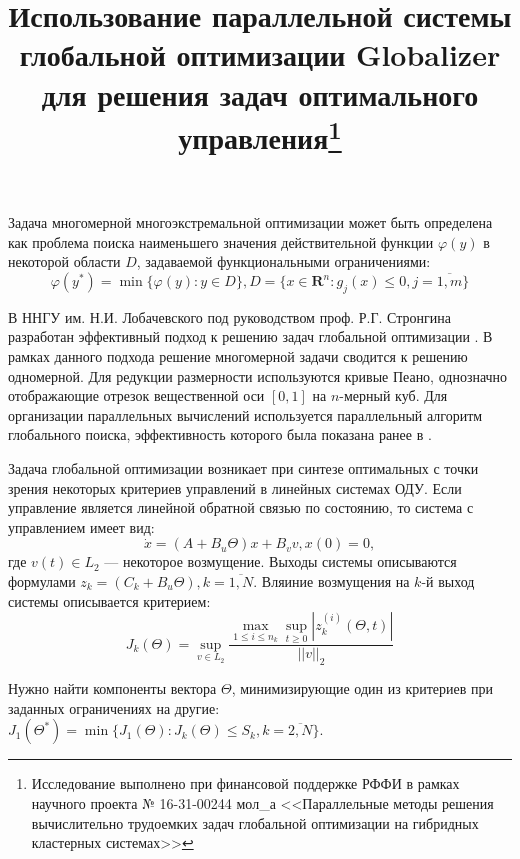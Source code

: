 \documentclass[11pt, oneside, a4paper]{article}
\begin{document}

\title{Использование параллельной системы глобальной оптимизации Globalizer для
решения задач оптимального управления\footnote{Исследование выполнено при финансовой
поддержке РФФИ в рамках научного проекта № 16-31-00244 мол\_а <<Параллельные методы
решения вычислительно трудоемких задач глобальной оптимизации на гибридных кластерных системах>>}}


Задача многомерной многоэкстремальной оптимизации может быть определена как проблема
поиска наименьшего значения действительной функции \(\varphi(y)\) в некоторой области \(D\),
задаваемой функциональными ограничениями:
\begin{displaymath}
  \label{task}
    \varphi(y^*)=\min\{\varphi(y):y\in D\}, D=\{x\in \mathbf{R}^n: g_j(x) \le 0, j=\overline{1,m}\}
\end{displaymath}

В ННГУ им. Н.И. Лобачевского под руководством проф. Р.Г. Стронгина разработан
эффективный подход к решению задач глобальной оптимизации \cite{strGergrParOptBook}.
В рамках данного подхода решение многомерной задачи сводится к решению одномерной.
Для редукции размерности используются кривые Пеано, однозначно отображающие отрезок
вещественной оси \([0,1]\) на \(n\)-мерный куб. Для организации параллельных вычислений
используется параллельный алгоритм глобального поиска, эффективность которого была
показана ранее в \cite{parallelMethod}.

Задача глобальной оптимизации возникает при синтезе оптимальных с точки зрения некоторых
критериев управлений в линейных системах ОДУ. Если управление является линейной обратной
связью по состоянию, то система с управлением имеет вид:
\begin{displaymath}
    \dot x = (A+B_u\Theta)x + B_v v, x(0)=0,
\end{displaymath}
где  \(v(t)\in L_2\) --- некоторое возмущение.
Выходы системы описываются формулами \(z_k=(C_k+B_u\Theta),k=\overline{1,N}\).
Вляиние возмущения на \(k\)-й выход системы описывается критерием:
\begin{displaymath}
  J_k(\Theta)=\sup_{v\in L_2} \frac{\max_{1\le i \le n_k} \sup_{t\ge 0}|z_k^{(i)}(\Theta,t)|}{||v||_2}
\end{displaymath}

Нужно найти компоненты вектора \(\Theta\), минимизирующие один из критериев при
заданных ограничениях на другие: \(J_1(\Theta^*)=\min\{J_1(\Theta):J_k(\Theta)\le S_k,k=\overline{2,N}\}\).
\end{document}
